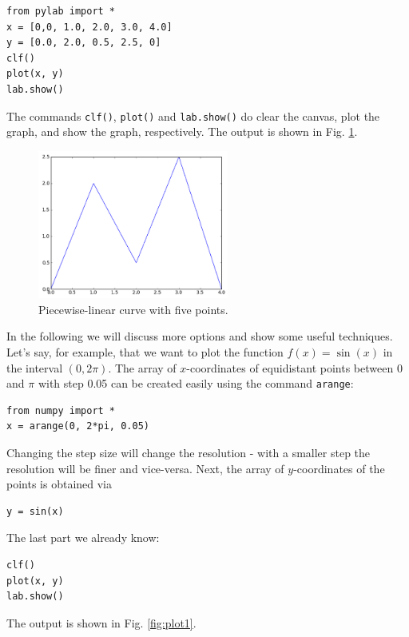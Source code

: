 \documentclass[article,A4,12pt]{llncs}
\begin{document}
\begin{verbatim}
from pylab import *
x = [0,0, 1.0, 2.0, 3.0, 4.0]
y = [0.0, 2.0, 0.5, 2.5, 0]
clf()
plot(x, y)
lab.show()
\end{verbatim}
The commands {\tt clf()}, {\tt plot()} and {\tt lab.show()} do clear the canvas, 
plot the graph, and show the graph, respectively.
The output is shown in Fig. \ref{fig:plot}.


\begin{figure}[!ht]
\begin{center}
\hbox{}
\hspace{-6mm}
\includegraphics[width=0.56\textwidth]{img/plot.png}
\end{center}
\vspace{-2mm}
\caption{Piecewise-linear curve with five points.}
\label{fig:plot}
\end{figure}
\noindent
In the following we will discuss more options and show some useful techniques.
Let's say, for example, that we want to plot the function $f(x) = \sin(x)$
in the interval $(0, 2\pi)$. The array of $x$-coordinates of equidistant points 
between 0 and $\pi$ with step 0.05 can be created easily using the command {\tt arange}:

\begin{verbatim}
from numpy import *
x = arange(0, 2*pi, 0.05)
\end{verbatim}
Changing the step size will change the resolution - with a smaller step the resolution will 
be finer and vice-versa. Next, the array of $y$-coordinates of the points is obtained via

\begin{verbatim}
y = sin(x)
\end{verbatim}
The last part we already know:

\begin{verbatim}
clf()
plot(x, y)
lab.show()
\end{verbatim}
\noindent
The output is shown in Fig. \ref{fig:plot1}.
\end{document}
